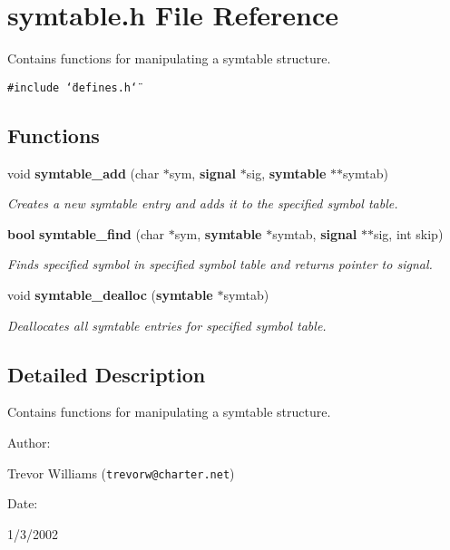 \section{symtable.h File Reference}
\label{symtable_8h}
Contains functions for manipulating a symtable structure. 


{\tt \#include \char`\"{}defines.h\char`\"{}}\par
\subsection*{Functions}
\begin{CompactItemize}
\item 
void {\bf symtable\_\-add} (char $\ast$sym, {\bf signal} $\ast$sig, {\bf symtable} $\ast$$\ast$symtab)
\begin{CompactList}\small\item\em Creates a new symtable entry and adds it to the specified symbol table.\item\end{CompactList}\item 
{\bf bool} {\bf symtable\_\-find} (char $\ast$sym, {\bf symtable} $\ast$symtab, {\bf signal} $\ast$$\ast$sig, int skip)
\begin{CompactList}\small\item\em Finds specified symbol in specified symbol table and returns pointer to signal.\item\end{CompactList}\item 
void {\bf symtable\_\-dealloc} ({\bf symtable} $\ast$symtab)
\begin{CompactList}\small\item\em Deallocates all symtable entries for specified symbol table.\item\end{CompactList}\end{CompactItemize}


\subsection{Detailed Description}
Contains functions for manipulating a symtable structure.



\begin{Desc}
\item[Author: ]\par
Trevor Williams ({\tt trevorw@charter.net}) \end{Desc}
\begin{Desc}
\item[Date: ]\par
1/3/2002\end{Desc}


